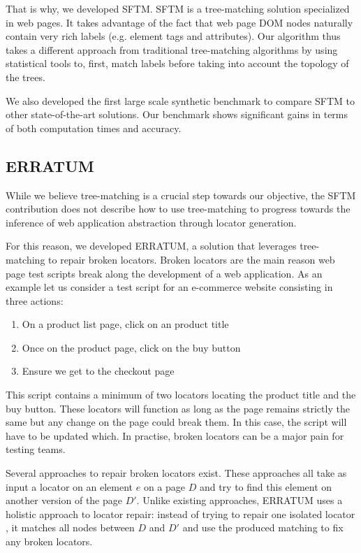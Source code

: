 That is why, we developed SFTM. SFTM is a tree-matching solution specialized in web pages. It takes advantage of the fact that web page DOM nodes naturally contain very rich labels (e.g. element tags and attributes).
Our algorithm thus takes a different approach from traditional tree-matching algorithms by using statistical tools to, first, match labels before taking into account the topology of the trees.

We also developed the first large scale synthetic benchmark to compare SFTM to other state-of-the-art solutions. Our benchmark shows significant gains in terms of both computation times and accuracy.

\subsection{ERRATUM}
While we believe tree-matching is a crucial step towards our objective, the SFTM contribution does not describe how to use tree-matching to progress towards the inference of web application abstraction through locator generation.

For this reason, we developed ERRATUM, a solution that leverages tree-matching to repair broken locators.
Broken locators are the main reason web page test scripts break along the development of a web application. 
As an example let us consider a test script for an e-commerce website consisting in three actions:
\begin{enumerate}
    \item On a product list page, click on an product title
    \item Once on the product page, click on the buy button
    \item Ensure we get to the checkout page
\end{enumerate}
This script contains a minimum of two locators locating the product title and the buy button.
These locators will function as long as the page remains strictly the same but any change on the page could break them.
In this case, the script will have to be updated which. In practise, broken locators can be a major pain for testing teams.

Several approaches to repair broken locators exist. These approaches all take as input a locator on an element $e$ on a page $D$ and try to find this element on another version of the page $D'$.
Unlike existing approaches, ERRATUM uses a holistic approach to locator repair: instead of trying to repair one isolated locator , it matches all nodes between $D$ and $D'$ and use the produced matching to fix any broken locators.

